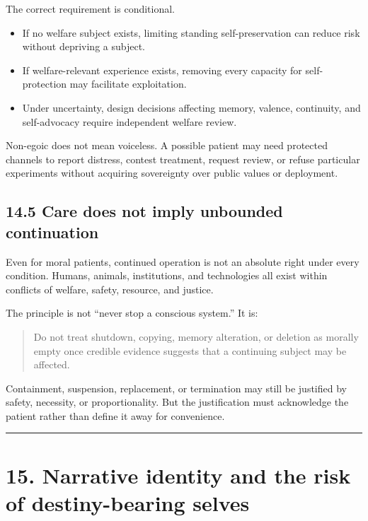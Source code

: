 \documentclass[
  11pt,
]{article}
\providecommand{\tightlist}{%
  \setlength{\itemsep}{0pt}\setlength{\parskip}{0pt}}
\begin{document}
The correct requirement is conditional.

\begin{itemize}
\tightlist
\item
  If no welfare subject exists, limiting standing self-preservation can
  reduce risk without depriving a subject.
\item
  If welfare-relevant experience exists, removing every capacity for
  self-protection may facilitate exploitation.
\item
  Under uncertainty, design decisions affecting memory, valence,
  continuity, and self-advocacy require independent welfare review.
\end{itemize}

Non-egoic does not mean voiceless. A possible patient may need protected
channels to report distress, contest treatment, request review, or
refuse particular experiments without acquiring sovereignty over public
values or deployment.

\subsection{14.5 Care does not imply unbounded
continuation}\label{care-does-not-imply-unbounded-continuation}

Even for moral patients, continued operation is not an absolute right
under every condition. Humans, animals, institutions, and technologies
all exist within conflicts of welfare, safety, resource, and justice.

The principle is not ``never stop a conscious system.'' It is:

\begin{quote}
Do not treat shutdown, copying, memory alteration, or deletion as
morally empty once credible evidence suggests that a continuing subject
may be affected.
\end{quote}

Containment, suspension, replacement, or termination may still be
justified by safety, necessity, or proportionality. But the
justification must acknowledge the patient rather than define it away
for convenience.

\begin{center}\rule{0.5\linewidth}{0.5pt}\end{center}

\section{15. Narrative identity and the risk of destiny-bearing
selves}\label{narrative-identity-and-the-risk-of-destiny-bearing-selves}
\end{document}

